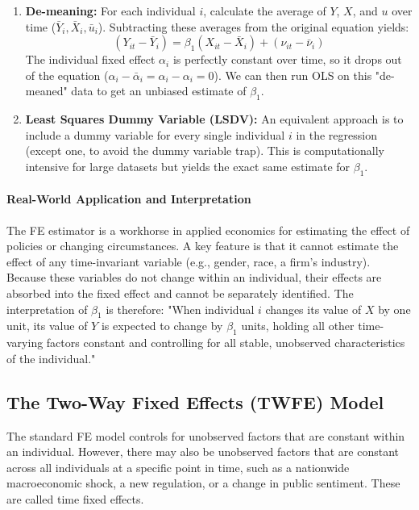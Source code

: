 \documentclass{article}
\providecommand{\tightlist}{
  \setlength{\itemsep}{0pt}
  \setlength{\parskip}{0pt}}
\begin{document}
\begin{enumerate}
    \tightlist
    \item \textbf{De-meaning:} For each individual $i$, calculate the average of $Y$, $X$, and $u$ over time ($\bar{Y}_i, \bar{X}_i, \bar{u}_i$). Subtracting these averages from the original equation yields:
    \begin{equation}
        (Y_{it} - \bar{Y}_i) = \beta_1 (X_{it} - \bar{X}_i) + (\nu_{it} - \bar{\nu}_i)
    \end{equation}
    The individual fixed effect $\alpha_i$ is perfectly constant over time, so it drops out of the equation ($\alpha_i - \bar{\alpha}_i = \alpha_i - \alpha_i = 0$). We can then run OLS on this "de-meaned" data to get an unbiased estimate of $\beta_1$.
    \item \textbf{Least Squares Dummy Variable (LSDV):} An equivalent approach is to include a dummy variable for every single individual $i$ in the regression (except one, to avoid the dummy variable trap). This is computationally intensive for large datasets but yields the exact same estimate for $\beta_1$.
\end{enumerate}

\paragraph{Real-World Application and Interpretation}
The FE estimator is a workhorse in applied economics for estimating the effect of policies or changing circumstances. A key feature is that it 
cannot estimate the effect of any time-invariant variable
 (e.g., gender, race, a firm's industry). Because these variables do not change within an individual, their effects are absorbed into the fixed effect and cannot be separately identified. The interpretation of $\beta_1$ is therefore: "When individual $i$ changes its value of $X$ by one unit, its value of $Y$ is expected to change by $\beta_1$ units, holding all other time-varying factors constant and controlling for all stable, unobserved characteristics of the individual."

\subsection{The Two-Way Fixed Effects (TWFE) Model}
\label{sub:twfe}

The standard FE model controls for unobserved factors that are constant within an individual. However, there may also be unobserved factors that are constant across all individuals at a specific point in time, such as a nationwide macroeconomic shock, a new regulation, or a change in public sentiment. These are called time fixed effects.
\end{document}
